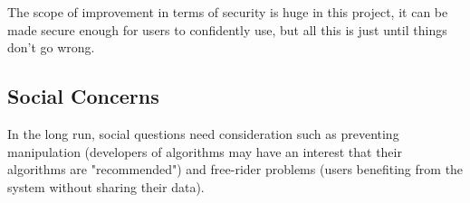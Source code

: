 The scope of improvement in terms of security is huge in this project, it can be made secure enough for users to confidently use, but all this is just until things don’t go wrong.

\subsection{Social Concerns}
In the long run, social questions need consideration such as preventing manipulation (developers of algorithms may have an interest that their algorithms are "recommended") and free-rider problems (users benefiting from the system without sharing their data).

